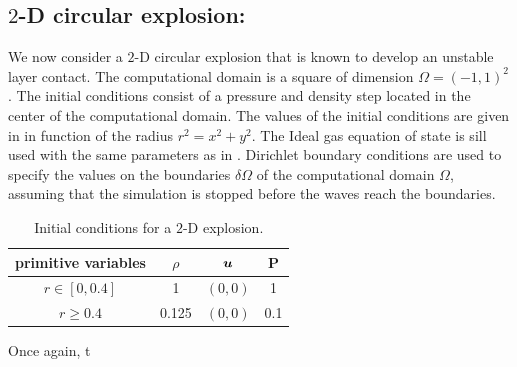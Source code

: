 \subsection{$2$-D circular explosion:} \label{sec:2d-circular-explosioin}
We now consider a $2$-D circular explosion \cite{Toro} that is known to develop an unstable layer contact. The computational domain is a square of dimension $\Omega = (-1, 1)^2$. The initial conditions consist of a pressure and density step located in the center of the computational domain. The values of the initial conditions are given in  in function of the radius $r^2 = x^2 + y^2$. The Ideal gas equation of state is sill used with the same parameters as in . Dirichlet boundary conditions are used to specify the values on the boundaries $\delta \Omega$ of the computational domain $\Omega$, assuming that the simulation is stopped before the waves reach the boundaries.
\begin{table}[H] 
\caption{\label{tb:ic-explosion} Initial conditions for a $2$-D explosion.}
\begin{center}
\begin{tabular}{|c|c|c|c|}
\hline
 primitive variables   & $\rho$ & $\boldsymbol u$ & P \\ \hline
 $r \in [ 0, 0.4 ]$& 1 & $(0,0)$ & 1\\ \hline
  $r \geq 0.4$& 0.125 & $(0,0)$ & 0.1\\ \hline
\end{tabular}
\end{center}
\nonumber
\end{table}
Once again, t
